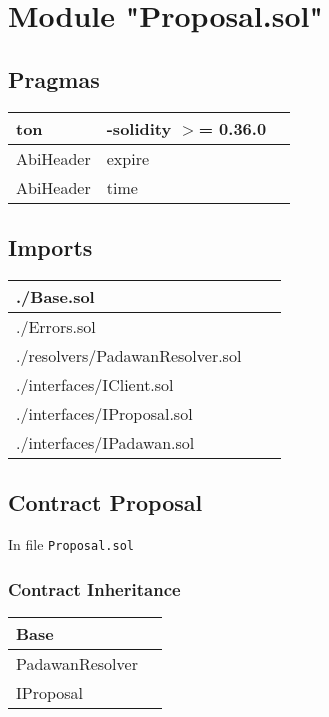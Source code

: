
\section{Module "Proposal.sol"}


\subsection{Pragmas}


\noindent\begin{tabular}{|l|l|p{5cm}|}\hline
ton & -solidity $>$= 0.36.0 &\\\hline
AbiHeader &  expire &\\\hline
AbiHeader &  time &\\\hline
\end{tabular}


\subsection{Imports}


\noindent\begin{tabular}{|l|l|p{5cm}|}\hline
./Base.sol &\\\hline
./Errors.sol &\\\hline
./resolvers/PadawanResolver.sol &\\\hline
./interfaces/IClient.sol &\\\hline
./interfaces/IProposal.sol &\\\hline
./interfaces/IPadawan.sol &\\\hline
\end{tabular}


\subsection{Contract Proposal}

\minitoc

In file {\tt Proposal.sol}

\subsubsection{Contract Inheritance}


\noindent\begin{tabular}{|l|p{5cm}|}\hline
Base & \\\hline
PadawanResolver & \\\hline
IProposal & \\\hline
\end{tabular}


